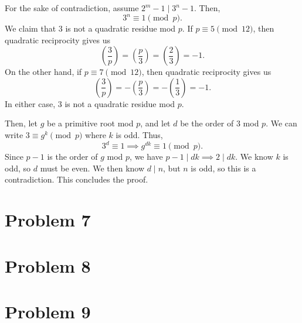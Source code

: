 \documentclass{scrartcl}
\begin{document}
For the sake of contradiction, assume $2^m - 1 \mid 3^n - 1$.
Then,
\[ 3^n \equiv 1 \pmod{p}. \]
We claim that $3$ is not a quadratic residue mod $p$.
If $p \equiv 5 \pmod{12}$, then quadratic reciprocity gives us
\[ \left(\dfrac{3}{p}\right) = \left(\dfrac{p}{3}\right) = \left(\dfrac{2}{3}\right) = -1. \]
On the other hand, if $p \equiv 7 \pmod{12}$, then quadratic reciprocity gives us
\[ \left(\dfrac{3}{p}\right) = -\left(\dfrac{p}{3}\right) = -\left(\dfrac{1}{3}\right) = -1. \]
In either case, $3$ is not a quadratic residue mod $p$.

Then, let $g$ be a primitive root mod $p$, and let $d$ be the order of $3$ mod $p$.
We can write $3 \equiv g^k \pmod{p}$ where $k$ is odd.
Thus,
\[ 3^d \equiv 1 \implies g^{dk} \equiv 1 \pmod{p}. \]
Since $p-1$ is the order of $g$ mod $p$, we have $p-1 \mid dk \implies 2 \mid dk$.
We know $k$ is odd, so $d$ must be even.
We then know $d \mid n$, but $n$ is odd, so this is a contradiction.
This concludes the proof.


\pagebreak
\section*{Problem 7}

\pagebreak
\section*{Problem 8}

\pagebreak
\section*{Problem 9}

\pagebreak
\end{document}
